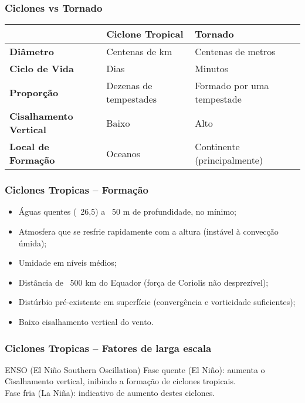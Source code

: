 \begin{frame}
\frametitle{Ciclones vs Tornado}
{\scriptsize
\begin{table}[h]
  \begin{tabular}{l|l|l}
  \hline\hline
                       & {\bf Ciclone Tropical} & {\bf Tornado} \\
  \hline
  {\bf Diâmetro}       & Centenas de km         & Centenas de metros \\
  {\bf Ciclo de Vida}  & Dias                   & Minutos            \\
  {\bf Proporção}      & Dezenas de tempestades & Formado por uma tempestade \\
  {\bf Cisalhamento Vertical} & Baixo           & Alto  \\
  {\bf Local de Formação}     & Oceanos         & Continente (principalmente) \\
  \hline
  \end{tabular}
\end{table}
}
\end{frame}

\begin{frame}
\frametitle{Ciclones Tropicas -- Formação}
  \begin{itemize}[<+-| alert@+>]
    \item Águas quentes (~26,5\textcelsius{}) a ~50 m de profundidade, no mínimo;
    \item Atmosfera que se resfrie rapidamente com a altura (instável à convecção
          úmida);
    \item Umidade em níveis médios;
    \item Distância de ~500 km do Equador (força de Coriolis não desprezível);
    \item Distúrbio pré-existente em superfície (convergência e vorticidade
          suficientes);
    \item Baixo cisalhamento vertical do vento.
  \end{itemize}
\end{frame}


\begin{frame}
\frametitle{Ciclones Tropicas -- Fatores de larga escala}
  \begin{block}{ENSO (El Ni\~no Southern Oscillation)}
    Fase quente (El Niño): aumenta o  Cisalhamento vertical, inibindo a
    formação de ciclones tropicais.\\

    Fase fria (La Niña): indicativo de aumento destes ciclones.
  \end{block}
\end{frame}

